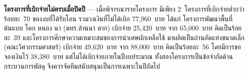 \begin{warnbox}
\textbf{โครงการที่เบิกจ่ายไม่ครบเมื่อปิดปี} --- เมื่อพิจารณารายโครงการ
มีเพียง 2~โครงการที่เบิกจ่ายต่ำกว่าร้อยละ~70 ของงบที่ได้รับโอน รวมวงเงินที่ไม่ได้เบิก 77,960~บาท
ได้แก่ โครงการพัฒนาพื้นที่ต้นแบบ โคก หนอง นา (มทร.ล้านนา ตาก) เบิกจ่าย 25,420~บาท
จาก 65,000~บาท คิดเป็นร้อยละ~39 และโครงการศึกษาความเหมาะสมของการนำเศษผักเหลือใช้
มาผลิตเป็นถ่านอัดแท่งขนาดเล็ก (คณะวิศวกรรมศาสตร์) เบิกจ่าย 49,620~บาท จาก 88,000~บาท
คิดเป็นร้อยละ~56 โดยมีการขอจองเงินไว้ 38,380~บาท แต่ไม่ได้เบิกจ่ายภายในปีงบประมาณ
ทั้งสองโครงการเป็นข้อจำกัดด้านกระบวนการพัสดุ จึงควรจัดทีมสนับสนุนเป็นการเฉพาะในปีถัดไป
\end{warnbox}
